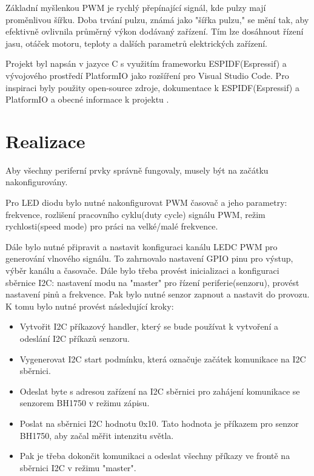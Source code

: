\documentclass[a4paper, 11pt]{article}
\begin{document}
Základní myšlenkou PWM je rychlý přepínající signál, kde pulzy mají proměnlivou šířku. Doba trvání pulzu, známá jako "šířka pulzu," se mění tak, aby efektivně ovlivnila průměrný výkon dodávaný zařízení. Tím lze dosáhnout řízení jasu, otáček motoru, teploty a dalších parametrů elektrických zařízení.

Projekt byl napsán v jazyce C s využitím frameworku ESPIDF(Espressif) a vývojového prostředí PlatformIO jako rozšíření pro Visual Studio Code. Pro inspiraci byly použity open-source zdroje\cite{source2}, dokumentace k ESPIDF(Espressif)\cite{source1} a PlatformIO \cite{source3} a obecné informace k projektu \cite{source5}.

\section{Realizace}
Aby všechny periferní prvky správně fungovaly, musely být na začátku nakonfigurovány.

Pro LED diodu bylo nutné nakonfigurovat PWM časovač a jeho parametry: frekvence, rozlišení pracovního cyklu(duty cycle) signálu PWM, režim rychlosti(speed mode) pro práci na velké/malé frekvence. 

Dále bylo nutné připravit a nastavit konfiguraci kanálu LEDC PWM pro generování vlnového signálu. To zahrnovalo nastavení GPIO pinu pro výstup, výběr kanálu a časovače. 
Dále bylo třeba provést inicializaci a konfiguraci sběrnice I2C: 
nastavení modu na "master" pro řízení periferie(senzoru), provést nastavení pinů a frekvence. Pak bylo nutné senzor zapnout a nastavit do provozu. K tomu bylo nutné provést následující kroky: 

\begin{itemize}
 
\item Vytvořit I2C příkazový handler, který se bude používat k vytvoření a odeslání I2C příkazů senzoru.

\item Vygenerovat I2C start podmínku, která označuje začátek komunikace na I2C sběrnici.

\item Odeslat byte s adresou zařízení na I2C sběrnici pro zahájení komunikace se senzorem BH1750 v režimu zápisu.

\item Poslat na sběrnici I2C hodnotu 0x10. Tato hodnota je příkazem pro senzor BH1750, aby začal měřit intenzitu světla. 

\item Pak je třeba dokončit komunikaci a odeslat všechny příkazy ve frontě na sběrnici I2C v režimu "master".
\end{itemize}
\end{document}
